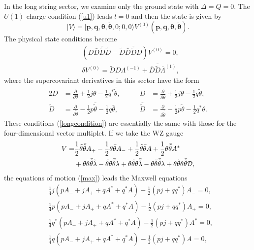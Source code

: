 \documentclass[a4paper,seceq,preprint]{ptptex}
\begin{document}
In the long string sector, we examine only the ground state 
with $\Delta=Q=0$. The $U(1)$ charge condition (\ref{u1}) 
leads $l=0$ and then the state is given by
\begin{equation}
 |V\rangle=|\boldsymbol p,\boldsymbol q,
\boldsymbol\theta,\boldsymbol{\tilde\theta},0;0,0\rangle 
V^{(0)}(\boldsymbol p,\boldsymbol q,
\boldsymbol\theta,\boldsymbol{\tilde\theta}).
\end{equation}
The physical state conditions become
\begin{subequations}\label{longcondition}
 \begin{align}
 & \left(D\bar D\bar{\tilde D}\tilde D-
\tilde D\bar D\bar{\tilde D}D\right)V^{(0)}=0,\label{max}\\
 & \delta V^{(0)}=\tilde DD\Lambda^{(-1)}+\bar D\bar{\tilde D}\bar\Lambda^{(1)},
 \end{align}
\end{subequations}
where the supercovariant derivatives in this sector have the form
\begin{alignat}{2}
 D&=\frac{\partial}{\partial\theta}+\frac{1}{2}j\bar\theta
-\frac{1}{2}q^*\bar{\tilde\theta},&\qquad
 \bar D&=\frac{\partial}{\partial\bar\theta}+\frac{1}{2}j\theta
-\frac{1}{2}q\tilde\theta,\nonumber\\
 \tilde D&=\frac{\partial}{\partial\tilde\theta}
-\frac{1}{2}p\bar{\tilde\theta}
-\frac{1}{2}q\bar\theta,&\qquad
 \bar{\tilde D}&=\frac{\partial}{\partial\bar{\tilde\theta}}
-\frac{1}{2}p\tilde\theta
-\frac{1}{2}q^*\theta.
\end{alignat}
These conditions (\ref{longcondition}) are essentially
the same with those for the four-dimensional vector
multiplet. If we take the WZ gauge
 \begin{align}
  V=&\frac{1}{2}\tilde\theta\bar{\tilde\theta}A_+
   -\frac{1}{2}\theta\bar\theta A_-
   +\frac{1}{2}\tilde\theta\bar\theta A
   +\frac{1}{2}\theta\bar{\tilde\theta}A^*\nonumber\\
  &
   +\theta\bar\theta\bar{\tilde\theta}\tilde\lambda
   -\tilde\theta\bar\theta\bar{\tilde\theta}\lambda
   +\theta\tilde\theta\bar\theta\bar{\tilde\lambda}
   -\theta\tilde\theta\bar{\tilde\theta}\bar\lambda
   +\theta\tilde\theta\bar\theta\bar{\tilde\theta}{\cal D},
 \end{align}
the equations of motion (\ref{max}) leads 
the Maxwell equations
 \begin{align}
  &\frac{1}{4}j(pA_-+jA_++qA^*+q^*A)
-\frac{1}{2}(pj+qq^*)A_-=0,\nonumber\\
  &\frac{1}{4}p(pA_-+jA_++qA^*+q^*A)
-\frac{1}{2}(pj+qq^*)A_+=0,\nonumber\\
  &\frac{1}{4}q^*(pA_-+jA_++qA^*+q^*A)
-\frac{1}{2}(pj+qq^*)A^*=0,\nonumber\\
  &\frac{1}{4}q(pA_-+jA_++qA^*+q^*A)
-\frac{1}{2}(pj+qq^*)A=0,
\end{align}
\end{document}
